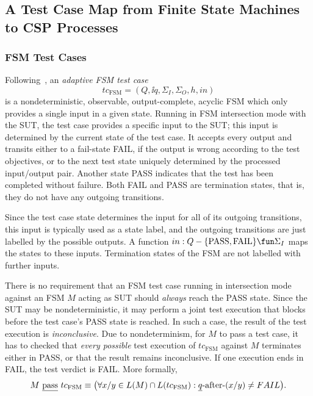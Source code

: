 \subsection{A Test Case Map from Finite State Machines to CSP Processes}
\label{sec:tcmap}

\subsubsection*{FSM Test Cases}

Following~\cite{DBLP:conf/hase/PetrenkoY14}, 
an \emph{adaptive FSM test case} 
$$
tc_\text{FSM}=(Q,\ii q,\Sigma_I,\Sigma_O,h,in)
$$ 
is a nondeterministic, observable, output-complete, acyclic FSM which only provides a single input in a given state. Running in FSM intersection mode with the SUT, the test case provides a specific input to the SUT; this input is determined by the current state of the test case. It accepts every output and transits either to a fail-state FAIL, if the output is wrong according to the test objectives, or to the next test state uniquely determined  by the processed input/output pair. Another state PASS indicates that
the test has been completed without failure. Both FAIL and PASS are termination states, that is, they do not have any outgoing transitions.

Since the test case state determines the input for all of its outgoing transitions, this input is typically used as a state label, and the outgoing transitions are just labelled by the possible outputs. A function $in : Q -\{  \text{PASS}, \text{FAIL} \} 
\fun\Sigma_I$ maps the states to these inputs. Termination states
of the FSM are not labelled with further inputs.

There is no requirement that an FSM test case running in intersection mode against
an FSM $M$ acting as SUT should {\it always} reach the PASS state. Since the SUT may be nondeterministic, it may perform a joint test execution that blocks before
the test case's PASS state is reached. In such a case, the result of the test execution is \emph{inconclusive}. Due to nondeterminism, for $M$ to pass a test case, it 
has to checked that {\it every possible} test execution of  $tc_\text{FSM}$ against $M$
terminates either in PASS, or that the result remains inconclusive. If one execution ends in FAIL, the test verdict is FAIL. More formally,
$$
M\ \underline{\text{pass}}\ tc_\text{FSM} \equiv 
\big(
\forall x/y \in L(M)\cap L(tc_\text{FSM}): \underline{q}\text{-after-}(x/y) \neq FAIL
\big).
$$

